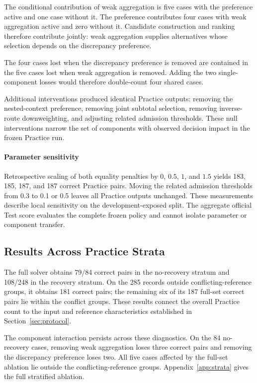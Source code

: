 \documentclass[conference]{IEEEtran}
\begin{document}
The conditional contribution of weak aggregation is five cases with the preference active and one case without it. The preference contributes four cases with weak aggregation active and zero without it. Candidate construction and ranking therefore contribute jointly: weak aggregation supplies alternatives whose selection depends on the discrepancy preference.

The four cases lost when the discrepancy preference is removed are contained in the five cases lost when weak aggregation is removed. Adding the two single-component losses would therefore double-count four shared cases.

Additional interventions produced identical Practice outputs: removing the nested-context preference, removing joint subtotal selection, removing inverse-route downweighting, and adjusting related admission thresholds. These null interventions narrow the set of components with observed decision impact in the frozen Practice run.

\paragraph{Parameter sensitivity}
Retrospective scaling of both equality penalties by $0$, $0.5$, $1$, and $1.5$ yields 183, 185, 187, and 187 correct Practice pairs. Moving the related admission thresholds from 0.3 to 0.1 or 0.5 leaves all Practice outputs unchanged. These measurements describe local sensitivity on the development-exposed split. The aggregate official Test score evaluates the complete frozen policy and cannot isolate parameter or component transfer.

\subsection{Results Across Practice Strata}
\label{sec:practice-diagnostics}

The full solver obtains 79/84 correct pairs in the no-recovery stratum and 108/248 in the recovery stratum. On the 285 records outside conflicting-reference groups, it obtains 181 correct pairs; the remaining six of its 187 full-set correct pairs lie within the conflict groups. These results connect the overall Practice count to the input and reference characteristics established in Section~\ref{sec:protocol}.

The component interaction persists across these diagnostics. On the 84 no-recovery cases, removing weak aggregation loses three correct pairs and removing the discrepancy preference loses two. All five cases affected by the full-set ablation lie outside the conflicting-reference groups. Appendix~\ref{app:strata} gives the full stratified ablation.
\end{document}
